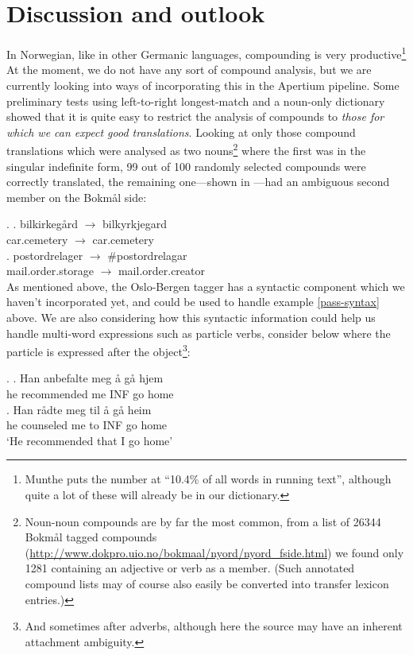 \documentclass[11pt]{article}
\begin{document}
\section{Discussion and outlook}
In Norwegian, like in other Germanic languages, compounding is very
productive\footnote{Munthe \citep[1972, in][p.~1]{johannessen1996aan}
  puts the number at ``10.4\% of all words in running text'', although
  quite a lot of these will already be in our dictionary.} At the
moment, we do not have any sort of compound analysis, but we are
currently looking into ways of incorporating this in the Apertium
pipeline. Some preliminary tests using left-to-right longest-match and
a noun-only dictionary showed that it is quite easy to restrict the
analysis of compounds to \emph{those for which we can expect good
  translations}. Looking at only those compound translations which
were analysed as two nouns\footnote{Noun-noun compounds are
  by far the most common, from a list of 26344 Bokmål tagged compounds
  (\href{http://www.dokpro.uio.no/bokmaal/nyord/nyord_fside.html}{http://www.dokpro.uio.no/bokmaal/nyord/nyord\_fside.html})
  we
  found only 1281 containing an adjective or verb as a member. (Such
  annotated compound lists may of course also easily be converted into
  transfer lexicon entries.)} where the first was in the singular
indefinite form, 99 out of 100 randomly selected compounds were
correctly translated, the remaining one—shown in \Next[b]—had an
ambiguous second member on the Bokmål side:

\ex. \ag. bilkirkegård $\rightarrow$ bilkyrkjegard\\
car.cemetery $\rightarrow$ car.cemetery\\
\bg. postordrelager $\rightarrow$ \#postordrelagar\\
mail.order.storage $\rightarrow$ mail.order.creator\\

As mentioned above, the Oslo-Bergen tagger has a syntactic component
which we haven't incorporated yet, and could be used to handle example
\ref{pass-syntax} above. We are also considering how this syntactic
information could help us handle multi-word expressions such as
particle verbs, consider \Next below where the particle is expressed
after the object\footnote{And sometimes after adverbs, although
  here the source may have an inherent attachment ambiguity.}:

\ex. \ag. Han anbefalte meg å gå hjem\\
he recommended me INF go home\\
\bg. Han rådte meg til å gå heim\\
he counseled me to INF go home\\
`He recommended that I go home'
\end{document}
